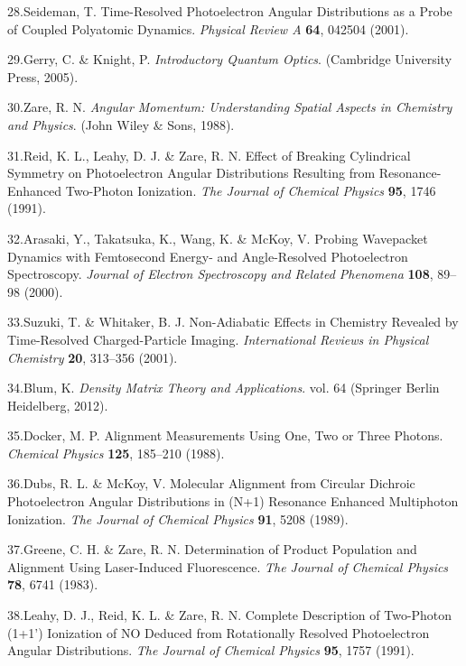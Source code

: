 \documentclass[10pt]{article}
\begin{document}
\label{csl:28}28.Seideman, T. {Time-Resolved Photoelectron Angular Distributions as a Probe of Coupled Polyatomic Dynamics}. \textit{Physical Review A} \textbf{64}, 042504 (2001).

\label{csl:29}29.Gerry, C. \& Knight, P. \textit{{Introductory {{Quantum Optics}}}}. ({Cambridge University Press}, 2005).

\label{csl:30}30.Zare, R. N. \textit{{Angular {{Momentum}}: {{Understanding}} Spatial Aspects in Chemistry and Physics}}. ({John Wiley \& Sons}, 1988).

\label{csl:31}31.Reid, K. L., Leahy, D. J. \& Zare, R. N. {Effect of Breaking Cylindrical Symmetry on Photoelectron Angular Distributions Resulting from Resonance-Enhanced Two-Photon Ionization}. \textit{The Journal of Chemical Physics} \textbf{95}, 1746 (1991).

\label{csl:32}32.Arasaki, Y., Takatsuka, K., Wang, K. \& McKoy, V. {Probing Wavepacket Dynamics with Femtosecond Energy- and Angle-Resolved Photoelectron Spectroscopy}. \textit{Journal of Electron Spectroscopy and Related Phenomena} \textbf{108}, 89–98 (2000).

\label{csl:33}33.Suzuki, T. \& Whitaker, B. J. {Non-Adiabatic Effects in Chemistry Revealed by Time-Resolved Charged-Particle Imaging}. \textit{International Reviews in Physical Chemistry} \textbf{20}, 313–356 (2001).

\label{csl:34}34.Blum, K. \textit{{Density {{Matrix Theory}} and {{Applications}}}}. vol. 64 ({Springer Berlin Heidelberg}, 2012).

\label{csl:35}35.Docker, M. P. {Alignment Measurements Using One, Two or Three Photons}. \textit{Chemical Physics} \textbf{125}, 185–210 (1988).

\label{csl:36}36.Dubs, R. L. \& McKoy, V. {Molecular Alignment from Circular Dichroic Photoelectron Angular Distributions in (N+1) Resonance Enhanced Multiphoton Ionization}. \textit{The Journal of Chemical Physics} \textbf{91}, 5208 (1989).

\label{csl:37}37.Greene, C. H. \& Zare, R. N. {Determination of Product Population and Alignment Using Laser-Induced Fluorescence}. \textit{The Journal of Chemical Physics} \textbf{78}, 6741 (1983).

\label{csl:38}38.Leahy, D. J., Reid, K. L. \& Zare, R. N. {Complete Description of Two-Photon (1+1') Ionization of {{NO}} Deduced from Rotationally Resolved Photoelectron Angular Distributions}. \textit{The Journal of Chemical Physics} \textbf{95}, 1757 (1991).
\end{document}
